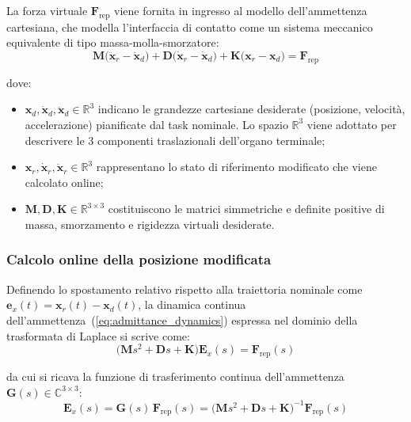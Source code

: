 La forza virtuale $\boldsymbol{F}_{\text{rep}}$ viene fornita in ingresso al modello dell'ammettenza cartesiana, che modella l'interfaccia di contatto come un sistema meccanico equivalente di tipo massa-molla-smorzatore:
\begin{equation}
\boldsymbol{M} \big(\ddot{\boldsymbol{x}}_r - \ddot{\boldsymbol{x}}_d\big) + \boldsymbol{D} \big(\dot{\boldsymbol{x}}_r - \dot{\boldsymbol{x}}_d\big) + \boldsymbol{K} \big(\boldsymbol{x}_r - \boldsymbol{x}_d\big) = \boldsymbol{F}_{\text{rep}}
\label{eq:admittance_dynamics}
\end{equation}

dove:
\begin{itemize}
	\item $\boldsymbol{x}_d, \dot{\boldsymbol{x}}_d, \ddot{\boldsymbol{x}}_d \in \mathbb{R}^3$ indicano le grandezze cartesiane desiderate (posizione, velocità, accelerazione) pianificate dal task nominale. Lo spazio $\mathbb{R}^3$ viene adottato per descrivere le 3 componenti traslazionali dell'organo terminale;
	\item $\boldsymbol{x}_r, \dot{\boldsymbol{x}}_r, \ddot{\boldsymbol{x}}_r \in \mathbb{R}^3$ rappresentano lo stato di riferimento modificato che viene calcolato online;
	\item $\boldsymbol{M}, \boldsymbol{D}, \boldsymbol{K} \in \mathbb{R}^{3 \times 3}$ costituiscono le matrici simmetriche e definite positive di massa, smorzamento e rigidezza virtuali desiderate.
\end{itemize}

\subsubsection{Calcolo online della posizione modificata}

Definendo lo spostamento relativo rispetto alla traiettoria nominale come $\boldsymbol{e}_x(t) = \boldsymbol{x}_r(t) - \boldsymbol{x}_d(t)$, la dinamica continua dell'ammettenza~(\ref{eq:admittance_dynamics}) espressa nel dominio della trasformata di Laplace si scrive come:
\begin{equation}
\Big( \boldsymbol{M} s^2 + \boldsymbol{D} s + \boldsymbol{K} \Big) \boldsymbol{E}_x(s) = \boldsymbol{F}_{\text{rep}}(s)
\end{equation}

da cui si ricava la funzione di trasferimento continua dell'ammettenza $\boldsymbol{G}(s) \in \mathbb{C}^{3 \times 3}$:
\begin{equation}
\boldsymbol{E}_x(s) = \boldsymbol{G}(s) \, \boldsymbol{F}_{\text{rep}}(s) = \Big( \boldsymbol{M} s^2 + \boldsymbol{D} s + \boldsymbol{K} \Big)^{-1} \boldsymbol{F}_{\text{rep}}(s)
\end{equation}

